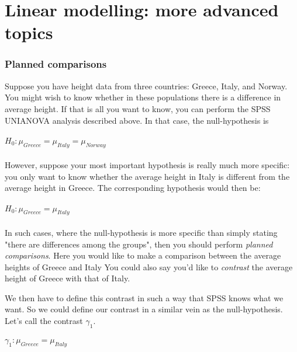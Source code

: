 
\chapter{Linear modelling: more advanced topics}\label{chap:advanced}


\subsection{Planned comparisons}

Suppose you have height data from three countries: Greece, Italy, and Norway. You might wish to know whether in these populations there is a difference in average height. If that is all you want to know, you can perform the SPSS UNIANOVA analysis described above. In that case, the null-hypothesis is
\\
\\
$H_0: \mu_{Greece}=\mu_{Italy}=\mu_{Norway}$
\\
\\
However, suppose your most important hypothesis is really much more specific: you only want to know whether the average height in Italy is different from the average height in Greece. The corresponding hypothesis would then be: 
\\
\\
$H_0: \mu_{Greece}=\mu_{Italy}$
\\
\\
In such cases, where the null-hypothesis is more specific than simply stating "there are differences among the groups", then you should perform \textit{planned comparisons}. Here you would like to make a comparison between the average heights of Greece and Italy You could also say you'd like to \textit{contrast} the average height of Greece with that of Italy. 

We then have to define this contrast in such a way that SPSS knows what we want. So we could define our contrast in a similar vein as the null-hypothesis. Let's call the contrast $\gamma_1$.
\\
\\
$\gamma_1: \mu_{Greece}=\mu_{Italy}$
\\
\\

